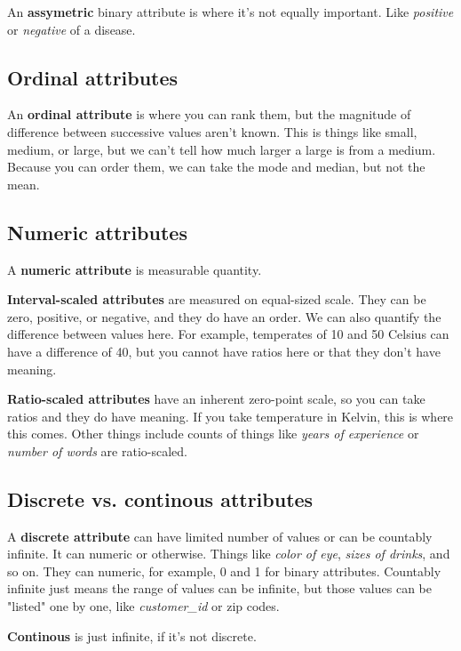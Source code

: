 \documentclass[12pt,a4paper]{article}
\begin{document}
An \textbf{assymetric} binary attribute is where it's not equally important. Like \textit{positive} or \textit{negative} of a disease.

\subsection{Ordinal attributes}

An \textbf{ordinal attribute} is where you can rank them, but the magnitude of difference between successive values aren't known. This is things like small, medium, or large, but we can't tell how much larger a large is from a medium. Because you can order them, we can take the mode and median, but not the mean. 

\subsection{Numeric attributes}

A \textbf{numeric attribute} is measurable quantity.

\textbf{Interval-scaled attributes} are measured on equal-sized scale. They can be zero, positive, or negative, and they do have an order. We can also quantify the difference between values here. For example, temperates of 10 and 50 Celsius can have a difference of 40, but you cannot have ratios here or that they don't have meaning.

\textbf{Ratio-scaled attributes} have an inherent zero-point scale, so you can take ratios and they do have meaning. If you take temperature in Kelvin, this is where this comes. Other things include counts of things like \textit{years of experience} or \textit{number of words} are ratio-scaled.


\subsection{Discrete vs. continous attributes}

A \textbf{discrete attribute} can have limited number of values or can be countably infinite. It can numeric or otherwise. Things like \textit{color of eye}, \textit{sizes of drinks}, and so on. They can numeric, for example, 0 and 1 for binary attributes. Countably infinite just means the range of values can be infinite, but those values can be "listed" one by one, like \textit{customer\_id} or zip codes.

\textbf{Continous} is just infinite, if it's not discrete.
\end{document}
